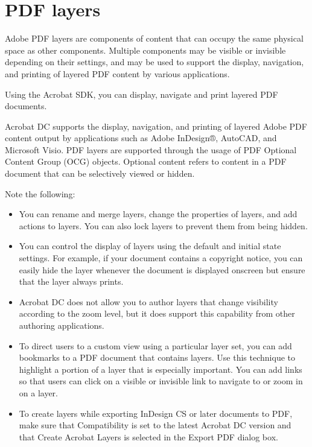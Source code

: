 \documentclass[letterpaper,12pt,english,openany,oneside]{sphinxmanual}
\begin{document}
\section{PDF layers}
\label{\detokenize{Overview_Metadata:pdf-layers}}
Adobe PDF layers are components of content that can occupy the same physical space as other components. Multiple components may be visible or invisible depending on their settings, and may be used to support the display, navigation, and printing of layered PDF content by various applications.

Using the Acrobat SDK, you can display, navigate and print layered PDF documents.

Acrobat DC supports the display, navigation, and printing of layered Adobe PDF content output by applications such as Adobe InDesign®, AutoCAD, and Microsoft Visio. PDF layers are supported through the usage of PDF Optional Content Group (OCG) objects. Optional content refers to content in a PDF document that can be selectively viewed or hidden.

Note the following:
\begin{itemize}
\item {} 
You can rename and merge layers, change the properties of layers, and add actions to layers. You can also lock layers to prevent them from being hidden.

\item {} 
You can control the display of layers using the default and initial state settings. For example, if your document contains a copyright notice, you can easily hide the layer whenever the document is displayed onscreen but ensure that the layer always prints.

\item {} 
Acrobat DC does not allow you to author layers that change visibility according to the zoom level, but it does support this capability from other authoring applications.

\item {} 
To direct users to a custom view using a particular layer set, you can add bookmarks to a PDF document that contains layers. Use this technique to highlight a portion of a layer that is especially important. You can add links so that users can click on a visible or invisible link to navigate to or zoom in on a layer.

\item {} 
To create layers while exporting InDesign CS or later documents to PDF, make sure that Compatibility is set to the latest Acrobat DC version and that Create Acrobat Layers is selected in the Export PDF dialog box.

\end{itemize}
\end{document}
